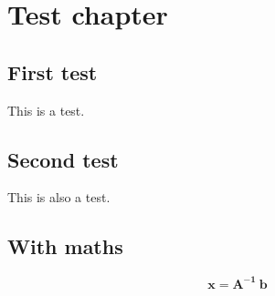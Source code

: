 



\setcounter{chapter}{2}
\chapter{Test chapter}

\section{First test}
This is a test.
\lipsum

\section{Second test}
This is also a test.
\lipsum

\section{With maths}
\lipsum[10]

\begin{equation}
  \mathbf{x} = \mathbf{A^{-1}} \  \mathbf{b}
\end{equation}

\lipsum[11]

